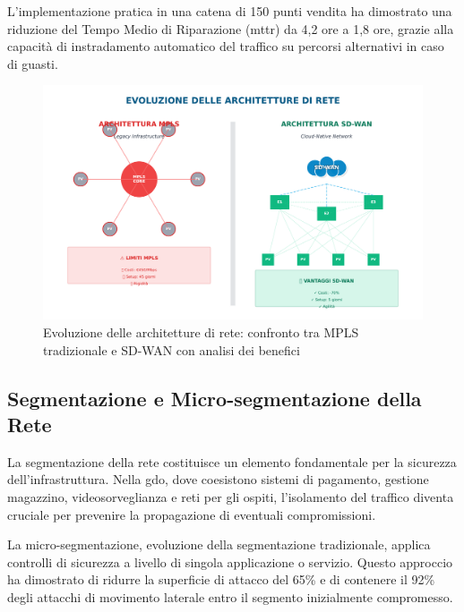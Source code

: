 L'implementazione pratica in una catena di 150 punti vendita ha dimostrato una riduzione del Tempo Medio di Riparazione (\gls{mttr}) da 4,2 ore a 1,8 ore, grazie alla capacità di instradamento automatico del traffico su percorsi alternativi in caso di guasti\autocite{NetworkWorld2024}.

\begin{figure}[htbp]
\centering
\includegraphics[width=\textwidth]{thesis_figures/cap3/fig2_network_modern.pdf}
\caption{Evoluzione delle architetture di rete: confronto tra MPLS tradizionale e SD-WAN con analisi dei benefici}
\label{fig:network_evolution}
\end{figure}

\subsection{\texorpdfstring{Segmentazione e Micro-segmentazione della Rete}{3.4.2 - Segmentazione e Micro-segmentazione della Rete}}
\label{subsec:segmentazione}

La segmentazione della rete costituisce un elemento fondamentale per la sicurezza dell'infrastruttura. Nella \gls{gdo}, dove coesistono sistemi di pagamento, gestione magazzino, videosorveglianza e reti per gli ospiti, l'isolamento del traffico diventa cruciale per prevenire la propagazione di eventuali compromissioni\autocite{nist2024}.

La micro-segmentazione, evoluzione della segmentazione tradizionale, applica controlli di sicurezza a livello di singola applicazione o servizio. Questo approccio ha dimostrato di ridurre la superficie di attacco del 65\% e di contenere il 92\% degli attacchi di movimento laterale entro il segmento inizialmente compromesso\autocite{Forrester2024zero}.

